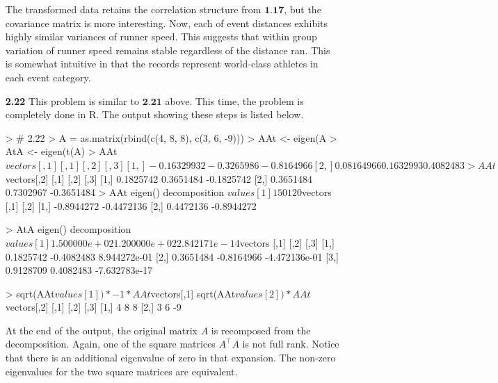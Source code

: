 \documentclass[oneside,12pt,letterpaper]{article}
\begin{document}
\begin{enumerate}
			The transformed data retains the correlation structure from $\textbf{1.17}$, but the covariance matrix is more interesting. Now, each of event distances exhibits highly similar variances of runner speed. This suggests that within group variation of runner speed remains stable regardless of the distance ran. This is somewhat intuitive in that the records represent world-class athletes in each event category.

		\pagebreak
		\item[\textbf{2.22}]
			This problem is similar to $\textbf{2.21}$ above. This time, the problem is completely done in R. The output showing these steps is listed below.\newline
			\begin{rc}
> # 2.22
> A = as.matrix(rbind(c(4, 8, 8), c(3, 6, -9)))
> AAt <- eigen(A %
> AtA <- eigen(t(A) %
> AAt$vectors[,1] %
	[,1]       [,2]       [,3]
[1,] -0.16329932 -0.3265986 -0.8164966
[2,]  0.08164966  0.1632993  0.4082483
> AAt$vectors[,2] %
	[,1]      [,2]       [,3]
[1,] 0.1825742 0.3651484 -0.1825742
[2,] 0.3651484 0.7302967 -0.3651484
> AAt
eigen() decomposition
$values
[1] 150 120

$vectors
	[,1]       [,2]
[1,] -0.8944272 -0.4472136
[2,]  0.4472136 -0.8944272

> AtA
eigen() decomposition
$values
[1] 1.500000e+02 1.200000e+02 2.842171e-14

$vectors
	[,1]       [,2]          [,3]
[1,] 0.1825742 -0.4082483  8.944272e-01
[2,] 0.3651484 -0.8164966 -4.472136e-01
[3,] 0.9128709  0.4082483 -7.632783e-17

> sqrt(AAt$values[1])*-1 * AAt$vectors[,1] %
sqrt(AAt$values[2]) * AAt$vectors[,2] %
	[,1] [,2] [,3]
[1,]    4    8    8
[2,]    3    6   -9

			\end{rc}

			At the end of the output, the original matrix $A$ is recomposed from the decomposition. Again, one of the square matrices $A^{\intercal}A$ is not full rank. Notice that there is an additional eigenvalue of zero in that expansion. The non-zero eigenvalues for the two square matrices are equivalent.

	\end{enumerate}
\end{document}
